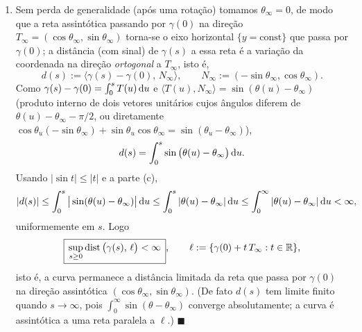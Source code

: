 \begin{enumerate}[label=(\alph*)]
\item Sem perda de generalidade (após uma rotação) tomamos $\theta_\infty=0$, de modo que a reta assintótica passando por $\gamma(0)$ na direção $T_\infty=(\cos\theta_\infty,\sin\theta_\infty)$ torna-se o eixo horizontal $\{y=\text{const}\}$ que passa por $\gamma(0)$; a distância (com sinal) de $\gamma(s)$ a essa reta é a variação da coordenada na direção \emph{ortogonal} a $T_\infty$, isto é,
\[
d(s):=\big\langle \gamma(s)-\gamma(0),\,N_\infty\big\rangle,\qquad N_\infty:=(-\sin\theta_\infty,\cos\theta_\infty).
\]
Como $\gamma(s)-\gamma(0)=\int_0^s T(u)\,\mathrm{d} u$ e $\langle T(u),N_\infty\rangle=\sin(\theta(u)-\theta_\infty)$ (produto interno de dois vetores unitários cujos ângulos diferem de $\theta(u)-\theta_\infty-\pi/2$, ou diretamente $\cos\theta_u(-\sin\theta_\infty)+\sin\theta_u\cos\theta_\infty=\sin(\theta_u-\theta_\infty)$),
\[
d(s)=\int_0^s\sin\big(\theta(u)-\theta_\infty\big)\,\mathrm{d} u.
\]
Usando $|\sin t|\le|t|$ e a parte (c),
\[
|d(s)|\le\int_0^s\big|\sin(\theta(u)-\theta_\infty)\big|\,\mathrm{d} u
\le\int_0^s|\theta(u)-\theta_\infty|\,\mathrm{d} u
\le\int_0^\infty|\theta(u)-\theta_\infty|\,\mathrm{d} u<\infty,
\]
uniformemente em $s$. Logo
\[
\boxed{\,\sup_{s\ge0}\operatorname{dist}\big(\gamma(s),\,\ell\big)<\infty\,},
\qquad \ell:=\{\gamma(0)+t\,T_\infty:t\in\mathbb{R}\},
\]
isto é, a curva permanece a distância limitada da reta que passa por $\gamma(0)$ na direção assintótica $(\cos\theta_\infty,\sin\theta_\infty)$. (De fato $d(s)$ tem limite finito quando $s\to\infty$, pois $\int_0^\infty\sin(\theta-\theta_\infty)$ converge absolutamente; a curva é assintótica a uma reta paralela a $\ell$.) \qquad$\blacksquare$

\end{enumerate}
